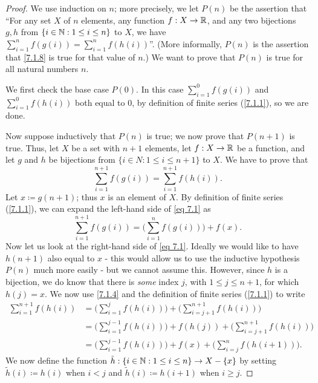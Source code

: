 \begin{proof}
  We use induction on \(n\);
  more precisely, we let \(P(n)\) be the assertion that ``For any set \(X\) of \(n\) elements, any function \(f : X \to \mathbb{R}\), and any two bijections \(g, h\) from \(\{i \in \mathbb{N} : 1 \leq i \leq n\}\) to \(X\), we have \(\sum_{i = 1}^n f(g(i)) = \sum_{i = 1}^n f(h(i))\)''.
  (More informally, \(P(n)\) is the assertion that \cref{7.1.8} is true for that value of \(n\).)
  We want to prove that \(P(n)\) is true for all natural numbers \(n\).

  We first check the base case \(P(0)\).
  In this case \(\sum_{i = 1}^0 f(g(i))\) and \(\sum_{i = 1}^0 f(h(i))\) both equal to \(0\), by definition of finite series (\cref{7.1.1}), so we are done.

  Now suppose inductively that \(P(n)\) is true;
  we now prove that \(P(n + 1)\) is true.
  Thus, let \(X\) be a set with \(n + 1\) elements, let \(f : X \to \mathbb{R}\) be a function, and let \(g\) and \(h\) be bijections from \(\{i \in N : 1 \leq i \leq n + 1\}\) to \(X\).
  We have to prove that
  \[
    \sum_{i = 1}^{n + 1} f(g(i)) = \sum_{i = 1}^{n + 1} f(h(i)). \tag{7.1}\label{eq 7.1}
  \]
  Let \(x \coloneqq g(n + 1)\);
  thus \(x\) is an element of \(X\).
  By definition of finite series (\cref{7.1.1}), we can expand the left-hand side of \eqref{eq 7.1} as
  \[
    \sum_{i = 1}^{n + 1} f(g(i)) = \Bigg(\sum_{i = 1}^n f(g(i))\Bigg) + f(x).
  \]
  Now let us look at the right-hand side of \eqref{eq 7.1}.
  Ideally we would like to have \(h(n + 1)\) also equal to \(x\)
  - this would allow us to use the inductive hypothesis \(P(n)\) much more easily
  - but we cannot assume this.
  However, since \(h\) is a bijection, we do know that there is \emph{some} index \(j\), with \(1 \leq j \leq n + 1\), for which \(h(j) = x\).
  We now use \cref{7.1.4} and the definition of finite series (\cref{7.1.1}) to write
  \begin{align*}
    \sum_{i = 1}^{n + 1} f(h(i)) & = \Bigg(\sum_{i = 1}^j f(h(i))\Bigg) + \Bigg(\sum_{i = j + 1}^{n + 1} f(h(i))\Bigg)                 \\
                                 & = \Bigg(\sum_{i = 1}^{j - 1} f(h(i))\Bigg) + f(h(j)) + \Bigg(\sum_{i = j + 1}^{n + 1} f(h(i))\Bigg) \\
                                 & = \Bigg(\sum_{i = 1}^{j - 1} f(h(i))\Bigg) + f(x) + \Bigg(\sum_{i = j}^n f(h(i + 1))\Bigg).
  \end{align*}
  We now define the function \(\tilde{h} : \{i \in \mathbb{N} : 1 \leq i \leq n\} \to X - \{x\}\) by setting \(\tilde{h}(i) \coloneqq h(i)\) when \(i < j\) and \(\tilde{h}(i) \coloneqq h(i + 1)\) when \(i \geq j\).

\end{proof}
